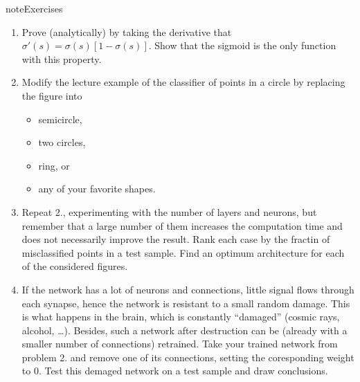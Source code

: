 \documentclass[letterpaper,10pt,english]{jupyterBook}
\begin{document}
\begin{sphinxadmonition}{note}{Exercises}
\begin{enumerate}
%
\item {} 
\sphinxAtStartPar
Prove (analytically) by taking the derivative that \( \sigma '(s) = \sigma (s) [1- \sigma (s)]\). Show that the sigmoid is the only function with this property.

\item {} 
\sphinxAtStartPar
Modify the lecture example of the classifier of points in a circle by replacing the figure into
\begin{itemize}
\item {} 
\sphinxAtStartPar
semicircle,

\item {} 
\sphinxAtStartPar
two circles,

\item {} 
\sphinxAtStartPar
ring, or

\item {} 
\sphinxAtStartPar
any of your favorite shapes.

\end{itemize}

\item {} 
\sphinxAtStartPar
Repeat 2., experimenting with the number of layers and neurons, but remember that a large number of them increases the computation time and does not necessarily improve the result. Rank each case by the fractin of misclassified points in a test sample. Find an optimum architecture for each of the considered figures.

\item {} 
\sphinxAtStartPar
If the network has a lot of neurons and connections, little signal flows through each synapse, hence the network is resistant to a small random damage. This is what happens in the brain, which is constantly “damaged” (cosmic rays, alcohol, …). Besides, such a network after destruction can be (already with a smaller number of connections) retrained. Take your trained network from problem 2. and remove one of its  connections, setting the coresponding weight to 0. Test this demaged network on a test sample and draw conclusions.


\end{enumerate}
\end{sphinxadmonition}
\end{document}
